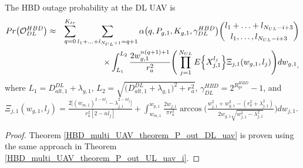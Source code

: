 \begin{theorem} \label{HBD_multi_UAV_theorem_P_out_DL_uav}
The HBD outage probability at the DL UAV is
\begin{eqnarray} \label{HBD_multi_UAV_P_out_DL_uav}
Pr\big(\mathcal{O}_{DL}^{HBD}\big) & \approx & \sum_{q=0}^{K_{tr}} \sum_{l_1+\ldots+l_{N_{UL}+1}=q+1} \alpha\big(q,P_{g,1},K_{g,1},\gamma_{DL}^{HBD}\big) \binom{l_1 + \ldots + l_{N_{UL}-i+3}}{l_1,\ldots, l_{N_{UL}-i+3}} \nonumber\\ 
 & & \hspace{0.5cm} \times \int_{L_1}^{L_2} \frac{2w_{g,1}^{n(q+1)+1}}{r_a^2} \Bigg( \prod_{j=1}^{N_{UL}} E\Big\{X_{j,1}^{l_j}\Big\} \Xi_{j,1}(w_{g,1},l_j) \Bigg){dw_{g,1}}_,
\end{eqnarray}
where $L_1 = D_{alt,1}^{DL} + \lambda_{g,1}$, $L_2 = \sqrt{\big(D_{alt,1}^{DL} + \lambda_{g,1}\big)^2 + r_{a}^2}$, $\gamma_{DL}^{HBD} = 2^{R_{gs}^{HBD}}-1$, and $\Xi_{j,1}(w_{g,1},l_j) = \frac{2\big[(w_{m,1})^{2-nl_j} - \lambda_{j,1}^{2-nl_j}\big]}{r_a^2[2-nl_j]} + \int_{w_{m,1}}^{w_{p,1}} \frac{2w_{j,1}}{\pi r_a^2}\arccos\Bigg( \frac{w_{j,1}^2 + w_{g,1}^2 - (r_a^2+\lambda_{j,1}^2)}{2w_{g,1}\sqrt{w_{j,1}^2 - \lambda_{j,1}^2}} \Bigg) {dw_{j,1}}$.
\end{theorem}
\begin{proof}
Theorem \ref{HBD_multi_UAV_theorem_P_out_DL_uav} is proven using the same approach in Theorem \ref{HBD_multi_UAV_theorem_P_out_UL_uav_i}.
\end{proof}


